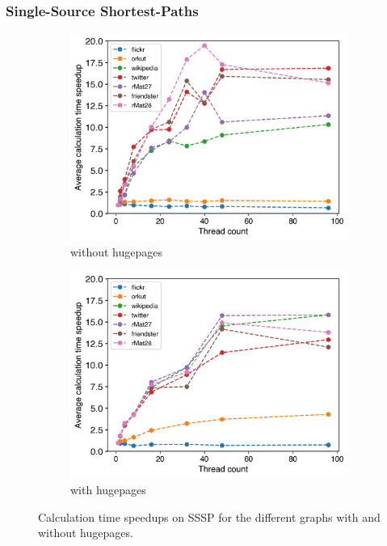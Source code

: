 \subsubsection{Single-Source Shortest-Paths}
\begin{figure}
	\hfil
	\begin{subfigure}{0.4\textwidth}
		\includegraphics[width=\linewidth]{../../plots/singleNodeSSSPGaloisThreads.png}
		\caption{without hugepages}
		\label{fig:galoisSpeedupSSSP_noHP}
	\end{subfigure}
	\begin{subfigure}{0.4\textwidth}
		\includegraphics[width=\linewidth]{../../plots/singleNodeSSSPGaloisHPThreads.png}
		\caption{with hugepages}
		\label{fig:galoisSpeedupSSSP_HP}
	\end{subfigure}
	\hfil
	\caption{Calculation time speedups on SSSP for the different graphs with and without hugepages.}
	\label{fig:galoisSpeedupSSSP}
\end{figure}
